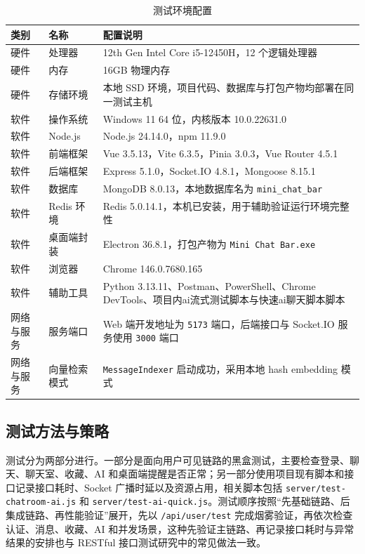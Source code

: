 \begin{table}[!htbp]
\centering
\caption{测试环境配置}
\label{tab:6-1}
\small
\renewcommand{\arraystretch}{1.15}
\setlength{\tabcolsep}{0.8ex}
\begin{tabular}{M{0.14\textwidth}M{0.22\textwidth}p{0.52\textwidth}}
\toprule
\textbf{类别} & \textbf{名称} & \textbf{配置说明} \\
\midrule
硬件 & 处理器 & 12th Gen Intel Core i5-12450H，12 个逻辑处理器 \\
硬件 & 内存 & 16GB 物理内存 \\
硬件 & 存储环境 & 本地 SSD 环境，项目代码、数据库与打包产物均部署在同一测试主机 \\
软件 & 操作系统 & Windows 11 64 位，内核版本 10.0.22631.0 \\
软件 & Node.js & Node.js 24.14.0，npm 11.9.0 \\
软件 & 前端框架 & Vue 3.5.13，Vite 6.3.5，Pinia 3.0.3，Vue Router 4.5.1 \\
软件 & 后端框架 & Express 5.1.0，Socket.IO 4.8.1，Mongoose 8.15.1 \\
软件 & 数据库 & MongoDB 8.0.13，本地数据库名为 \texttt{mini\_chat\_bar} \\
软件 & Redis 环境 & Redis 5.0.14.1，本机已安装，用于辅助验证运行环境完整性 \\
软件 & 桌面端封装 & Electron 36.8.1，打包产物为 \texttt{Mini Chat Bar.exe} \\
软件 & 浏览器 & Chrome 146.0.7680.165 \\
软件 & 辅助工具 & Python 3.13.11、Postman、PowerShell、Chrome DevTools、项目内ai流式测试脚本与快速ai聊天脚本脚本 \\
网络与服务 & 服务端口 & Web 端开发地址为 \texttt{5173} 端口，后端接口与 Socket.IO 服务使用 \texttt{3000} 端口 \\
网络与服务 & 向量检索模式 & \texttt{MessageIndexer} 启动成功，采用本地 hash embedding 模式 \\
\bottomrule
\end{tabular}
\end{table}
\FloatBarrier

\subsection{测试方法与策略}

测试分为两部分进行。一部分是面向用户可见链路的黑盒测试，主要检查登录、聊天、聊天室、收藏、AI 和桌面端提醒是否正常；另一部分使用项目现有脚本和接口记录接口耗时、Socket 广播时延以及资源占用，相关脚本包括 \texttt{server/test-chatroom-ai.js} 和 \texttt{server/test-ai-quick.js}。测试顺序按照“先基础链路、后集成链路、再性能验证”展开，先以 \texttt{/api/user/test} 完成烟雾验证，再依次检查认证、消息、收藏、AI 和并发场景，这种先验证主链路、再记录接口耗时与异常结果的安排也与 RESTful 接口测试研究中的常见做法一致\cite{restfulapitest2025}。

